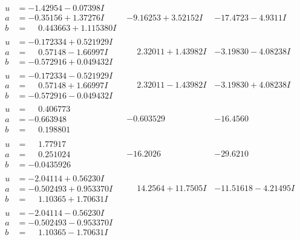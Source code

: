 \documentclass[1p]{elsarticle_modified}
\theoremstyle{definition}
\begin{document}
$$\begin{array}{c|c|c}
\begin{aligned}
u &= -1.42954 - 0.07398 I \\
a &= -0.35156 + 1.37276 I \\
b &= \phantom{-}0.443663 + 1.115380 I\end{aligned}
 & -9.16253 + 3.52152 I & -17.4723 - 4.9311 I \\ \hline\begin{aligned}
u &= -0.172334 + 0.521929 I \\
a &= \phantom{-}0.57148 - 1.66997 I \\
b &= -0.572916 + 0.049432 I\end{aligned}
 & \phantom{-}2.32011 + 1.43982 I & -3.19830 - 4.08238 I \\ \hline\begin{aligned}
u &= -0.172334 - 0.521929 I \\
a &= \phantom{-}0.57148 + 1.66997 I \\
b &= -0.572916 - 0.049432 I\end{aligned}
 & \phantom{-}2.32011 - 1.43982 I & -3.19830 + 4.08238 I \\ \hline\begin{aligned}
u &= \phantom{-}0.406773\phantom{ +0.000000I} \\
a &= -0.663948\phantom{ +0.000000I} \\
b &= \phantom{-}0.198801\phantom{ +0.000000I}\end{aligned}
 & -0.603529\phantom{ +0.000000I} & -16.4560\phantom{ +0.000000I} \\ \hline\begin{aligned}
u &= \phantom{-}1.77917\phantom{ +0.000000I} \\
a &= \phantom{-}0.251024\phantom{ +0.000000I} \\
b &= -0.0435926\phantom{ +0.000000I}\end{aligned}
 & -16.2026\phantom{ +0.000000I} & -29.6210\phantom{ +0.000000I} \\ \hline\begin{aligned}
u &= -2.04114 + 0.56230 I \\
a &= -0.502493 + 0.953370 I \\
b &= \phantom{-}1.10365 + 1.70631 I\end{aligned}
 & \phantom{-}14.2564 + 11.7505 I & -11.51618 - 4.21495 I \\ \hline\begin{aligned}
u &= -2.04114 - 0.56230 I \\
a &= -0.502493 - 0.953370 I \\
b &= \phantom{-}1.10365 - 1.70631 I\end{aligned}

\end{array}$$
\end{document}
